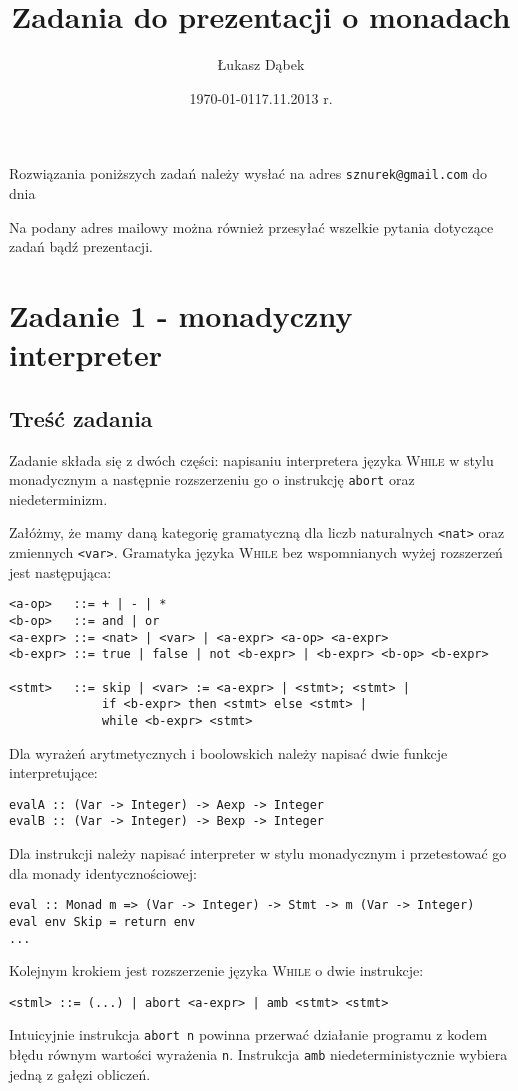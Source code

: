 \documentclass{article}[12pt]
\title{Zadania do prezentacji o monadach}
\author{Łukasz Dąbek}
\date{\today}
\begin{document}
\maketitle

Rozwiązania poniższych zadań należy wysłać na adres \texttt{sznurek@gmail.com}
do dnia \date{17.11.2013 r.} Na podany adres mailowy można również przesyłać
wszelkie pytania dotyczące zadań bądź prezentacji.

\section{Zadanie 1 - monadyczny interpreter}
\subsection{Treść zadania}
Zadanie składa się z dwóch części: napisaniu interpretera języka
\textsc{While} w stylu monadycznym a następnie rozszerzeniu go o instrukcję
\texttt{abort} oraz niedeterminizm.

Załóżmy, że mamy daną kategorię gramatyczną dla liczb naturalnych \texttt{<nat>}
oraz zmiennych \texttt{<var>}. Gramatyka języka \textsc{While} bez wspomnianych
wyżej rozszerzeń jest następująca:
\begin{verbatim}
<a-op>   ::= + | - | *
<b-op>   ::= and | or
<a-expr> ::= <nat> | <var> | <a-expr> <a-op> <a-expr>
<b-expr> ::= true | false | not <b-expr> | <b-expr> <b-op> <b-expr>

<stmt>   ::= skip | <var> := <a-expr> | <stmt>; <stmt> |
             if <b-expr> then <stmt> else <stmt> |
             while <b-expr> <stmt>
\end{verbatim}

Dla wyrażeń arytmetycznych i boolowskich należy napisać dwie
funkcje interpretujące:
\begin{verbatim}
evalA :: (Var -> Integer) -> Aexp -> Integer
evalB :: (Var -> Integer) -> Bexp -> Integer
\end{verbatim}

Dla instrukcji należy napisać interpreter w stylu monadycznym i przetestować
go dla monady identycznościowej:
\begin{verbatim}
eval :: Monad m => (Var -> Integer) -> Stmt -> m (Var -> Integer)
eval env Skip = return env
...
\end{verbatim}

Kolejnym krokiem jest rozszerzenie języka \textsc{While} o dwie instrukcje:
\begin{verbatim}
<stml> ::= (...) | abort <a-expr> | amb <stmt> <stmt>
\end{verbatim}
Intuicyjnie instrukcja \texttt{abort n} powinna przerwać działanie programu
z kodem błędu równym wartości wyrażenia \texttt{n}. Instrukcja \texttt{amb}
niedeterministycznie wybiera jedną z gałęzi obliczeń.
\end{document}
